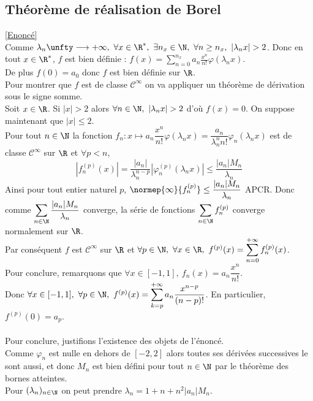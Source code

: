 \documentclass{book}
\begin{document}
	\subsection{Théorème de réalisation de Borel }
	\label{Théorème de réalisation de Borel corrigé}
	\textcolor{blue}{\hyperref[Théorème de réalisation de Borel]{[Enoncé]}}\\
	Comme $\lambda_n\unfty\longrightarrow +\infty,\ \forall x\in \R^*,\ \exists n_x\in \N,\ \forall n\geq n_x,\ |\lambda_nx|>2$. Donc en tout $x\in \R^*$, $f$ est bien définie : $f(x)=\displaystyle\sum_{n=0}^{n_x}a_n\frac{x^n}{n!}\varphi(\lambda_nx)$.\\
	De plus $f(0)=a_0$ donc $f$ est bien définie sur $\R$.\\
	Pour montrer que $f$ est de classe $\mathcal C^\infty$ on va appliquer un théorème de dérivation sous le signe somme.\\
	Soit $x\in \R$. Si $|x|>2$ alors $\forall n\in \N,\ |\lambda_nx|>2$ d'où $f(x)=0$. On suppose maintenant que $|x|\leq 2$.\\
	Pour tout $n\in \N$ la fonction $f_n:x\mapsto a_n\dfrac{x^n}{n!}\varphi(\lambda_nx)=\dfrac{a_n}{\lambda_n^nn!}\varphi_n(\lambda_nx)$ est de classe $\mathcal C^\infty$ sur $\R$ et $\forall p<n$,
	$$|f_n^{(p)}(x)|=\frac{|a_n|}{\lambda_n^{n-p}}|\varphi_n^{(p)}(\lambda_nx)|\leq\frac{|a_n|M_n}{\lambda_n}$$
	Ainsi pour tout entier naturel $p$, $\normep{\infty}{f_n^{(p)}}\leq \dfrac{|a_n|M_n}{\lambda_n}$ APCR. Donc comme $\displaystyle\sum_{n\in \N}\frac{|a_n|M_n}{\lambda_n}$ converge, la série de fonctions $\displaystyle\sum_{n\in \N}f_n^{(p)}$ converge normalement sur $\R$.\\
	Par conséquent $f$ est $\mathcal C^\infty$ sur $\R$ et $\forall p\in \N,\ \forall x\in \R,\ f^{(p)}(x)=\displaystyle\sum_{n=0}^{+\infty}f_n^{(p)}(x)$.\\
	Pour conclure, remarquons que $\forall x\in [-1,1],\ f_n(x)=a_n\dfrac{x^n}{n!}$.\\
	Donc $\forall x\in [-1,1],\ \forall p\in \N,\ f^{(p)}(x)=\displaystyle\sum_{k=p}^{+\infty}a_n\frac{x^{n-p}}{(n-p)!}$. En particulier, $f^{(p)}(0)=a_p$.\\\\
	Pour conclure, justifions l'existence des objets de l'énoncé.\\
	Comme $\varphi_n$ est nulle en dehors de $[-2,2]$ alors toutes ses dérivées successives le sont aussi, et donc $M_n$ est bien défini pour tout $n\in \N$ par le théorème des bornes atteintes.\\
	Pour $(\lambda_n)_{n\in \N}$ on peut prendre $\lambda_n=1+n+n^2|a_n|M_n$.
	
\end{document}
